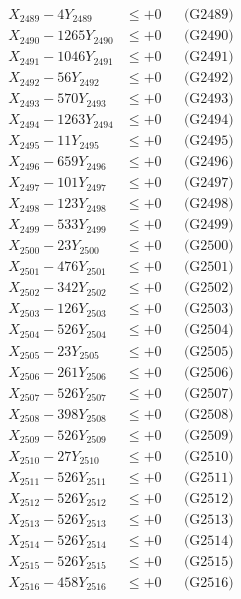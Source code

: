 \documentclass[a4paper,10pt]{article}
\begin{document}
{\begin{align}
X_{2489} - 4Y_{2489} &\leq +0 && \text{(G2489)} \\
X_{2490} - 1265Y_{2490} &\leq +0 && \text{(G2490)} \\
\allowbreak
X_{2491} - 1046Y_{2491} &\leq +0 && \text{(G2491)} \\
X_{2492} - 56Y_{2492} &\leq +0 && \text{(G2492)} \\
X_{2493} - 570Y_{2493} &\leq +0 && \text{(G2493)} \\
X_{2494} - 1263Y_{2494} &\leq +0 && \text{(G2494)} \\
X_{2495} - 11Y_{2495} &\leq +0 && \text{(G2495)} \\
X_{2496} - 659Y_{2496} &\leq +0 && \text{(G2496)} \\
X_{2497} - 101Y_{2497} &\leq +0 && \text{(G2497)} \\
X_{2498} - 123Y_{2498} &\leq +0 && \text{(G2498)} \\
X_{2499} - 533Y_{2499} &\leq +0 && \text{(G2499)} \\
X_{2500} - 23Y_{2500} &\leq +0 && \text{(G2500)} \\
\allowbreak
X_{2501} - 476Y_{2501} &\leq +0 && \text{(G2501)} \\
X_{2502} - 342Y_{2502} &\leq +0 && \text{(G2502)} \\
X_{2503} - 126Y_{2503} &\leq +0 && \text{(G2503)} \\
X_{2504} - 526Y_{2504} &\leq +0 && \text{(G2504)} \\
X_{2505} - 23Y_{2505} &\leq +0 && \text{(G2505)} \\
X_{2506} - 261Y_{2506} &\leq +0 && \text{(G2506)} \\
X_{2507} - 526Y_{2507} &\leq +0 && \text{(G2507)} \\
X_{2508} - 398Y_{2508} &\leq +0 && \text{(G2508)} \\
X_{2509} - 526Y_{2509} &\leq +0 && \text{(G2509)} \\
X_{2510} - 27Y_{2510} &\leq +0 && \text{(G2510)} \\
\allowbreak
X_{2511} - 526Y_{2511} &\leq +0 && \text{(G2511)} \\
X_{2512} - 526Y_{2512} &\leq +0 && \text{(G2512)} \\
X_{2513} - 526Y_{2513} &\leq +0 && \text{(G2513)} \\
X_{2514} - 526Y_{2514} &\leq +0 && \text{(G2514)} \\
X_{2515} - 526Y_{2515} &\leq +0 && \text{(G2515)} \\
X_{2516} - 458Y_{2516} &\leq +0 && \text{(G2516)} \\

\end{align}}
\end{document}
